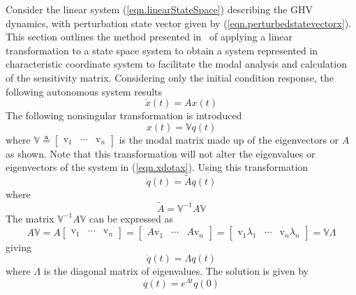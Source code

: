 Consider the linear system (\ref{eqn.linearStateSpace}) describing the GHV dynamics, with perturbation state vector given by (\ref{eqn.perturbedstatevectorx}).
This section outlines the method presented in\ \cite{etkin.atmosphericflight.1972} of applying a linear transformation to a state space system to obtain a system represented in characteristic coordinate system to facilitate the modal analysis and calculation of the sensitivity matrix.
Considering only the initial condition response, the following autonomous system results
\begin{equation}
  \label{eqn.xdotax}
  \dot{x}(t) = Ax(t)
\end{equation}
The following nonsingular transformation is introduced
\begin{equation*}
  x(t) = \mathbb{V}q(t)
\end{equation*}
where $\mathbb{V}\triangleq[\begin{array}{ccc} \mathrm{v}_{1} & \cdots & \mathrm{v}_{n} \end{array}]$ is the modal matrix made up of the eigenvectors or $A$ as shown.
Note that this transformation will not alter the eigenvalues or eigenvectors of the system in (\ref{eqn.xdotax}).
Using this transformation
\begin{equation*}
  \dot{q}(t) = \tilde{A}q(t)
\end{equation*}
where
\begin{equation*}
  \tilde{A}=\mathbb{V}^{-1}A\mathbb{V}
\end{equation*}
The matrix $\mathbb{V}^{-1}A\mathbb{V}$ can be expressed as
\begin{equation*}
  A\mathbb{V}
  =A \left[
  \begin{array}{ccc}
    \mathrm{v}_{1} & \cdots & \mathrm{v}_{n}
  \end{array} \right]
  =\left[
  \begin{array}{ccc}
    A\mathrm{v}_{1} & \cdots & A\mathrm{v}_{n}
  \end{array}\right]
  =\left[
  \begin{array}{ccc}
    \mathrm{v}_{1}\lambda_{1} & \cdots & \mathrm{v}_{n}\lambda_{n}
  \end{array}\right]
  =\mathbb{V}\Lambda%
\end{equation*}
giving
\begin{equation*}
  \dot{q}(t) =\Lambda q(t)
\end{equation*}
where $\Lambda$ is the diagonal matrix of eigenvalues.
The solution is given by
\begin{equation*}
  q(t)=e^{\Lambda t}q(0)
\end{equation*}
